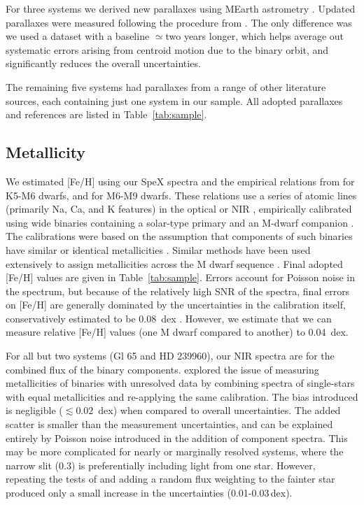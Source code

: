 \documentclass[twocolumn]{aastex62}
\begin{document}
For three systems we derived new parallaxes using MEarth astrometry \citep{Nutzman:2008gf}. Updated parallaxes were measured following the procedure from \citet{2014ApJ...784..156D}. The only difference was we used a dataset with a baseline $\simeq$two years longer, which helps average out systematic errors arising from centroid motion due to the binary orbit, and significantly reduces the overall uncertainties. 

The remaining five systems had parallaxes from a range of other literature sources, each containing just one system in our sample. All adopted parallaxes and references are listed in Table~\ref{tab:sample}.


\subsection{Metallicity}\label{sec:feh}

We estimated [Fe/H] using our SpeX spectra and the empirical relations from \citet{Mann2013a} for K5-M6 dwarfs, and \citet{Mann2014} for M6-M9 dwarfs. These relations use a series of atomic lines (primarily Na, Ca, and K features) in the optical or NIR \citep[e.g.,][]{RojasAyala:2010,Terrien:2012lr}, empirically calibrated using wide binaries containing a solar-type primary and an M-dwarf companion \citep[e.g.,][]{Bonfils:2005,Johnson2009,Neves2012}. The calibrations were based on the assumption that components of such binaries have similar or identical metallicities \citep[e.g.,][]{2015ApJ...801L..10T}. Similar methods have been used extensively to assign metallicities across the M dwarf sequence \citep[e.g.,][]{Terrien2015,Muirhead2015,Dressing2017,2018ApJ...853...30V,2018ApJ...854..145M}. Final adopted [Fe/H] values are given in Table~\ref{tab:sample}. Errors account for Poisson noise in the spectrum, but because of the relatively high SNR of the spectra, final errors on [Fe/H] are generally dominated by the uncertainties in the calibration itself, conservatively estimated to be 0.08~dex \citep{Mann2013a,Mann2014}. However, we estimate that we can measure relative [Fe/H] values (one M dwarf compared to another) to 0.04~dex. 

For all but two systems (Gl 65 and HD 239960), our NIR spectra are for the combined flux of the binary components. \citet{Mann2014} explored the issue of measuring metallicities of binaries with unresolved data by combining spectra of single-stars with equal metallicities and re-applying the same calibration. The bias introduced is negligible ($\lesssim0.02$~dex) when compared to overall uncertainties. The added scatter is smaller than the measurement uncertainties, and can be explained entirely by Poisson noise introduced in the addition of component spectra. This may be more complicated for nearly or marginally resolved systems, where the narrow slit (0.3\arcsec) is preferentially including light from one star. However, repeating the tests of \citet{Mann2014} and adding a random flux weighting to the fainter star produced only a small increase in the uncertainties (0.01-0.03\,dex).
\end{document}
